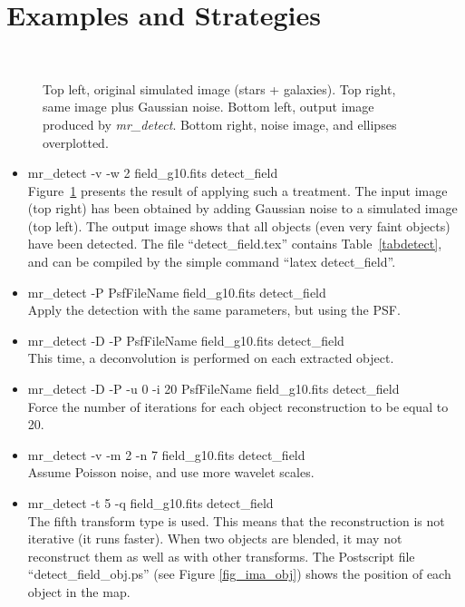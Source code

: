 \section{Examples and Strategies}

\begin{figure}[htb]
\centerline{
\vbox{
\hbox{
}
\hbox{
}
}}
\caption{Top left, original simulated image (stars + galaxies). Top right,
same image plus Gaussian noise. Bottom left, output image produced by
{\em mr\_detect}. Bottom right, noise image, and ellipses overplotted.}
\label{fig_bert}
\end{figure}

\begin{itemize}
\item  mr\_detect -v -w 2 field\_g10.fits detect\_field \\
Figure~\ref{fig_bert} presents the result of applying such a treatment.
The input image (top right)  has been obtained by adding 
Gaussian noise to a simulated image (top left). The output image shows
that all objects (even very faint objects) have been detected.
The file ``detect\_field.tex'' contains Table~\ref{tabdetect}, and
can be compiled by the simple command ``latex detect\_field''.
\item mr\_detect -P PsfFileName field\_g10.fits detect\_field \\
Apply the detection with the same parameters, but using the PSF.
\item mr\_detect -D -P PsfFileName field\_g10.fits detect\_field \\
This time, a deconvolution is performed on each extracted object. 
\item mr\_detect -D -P -u 0 -i 20 PsfFileName field\_g10.fits detect\_field \\
Force the number of iterations for each object reconstruction to be equal to 20.
\item  mr\_detect -v -m 2 -n 7 field\_g10.fits detect\_field \\
Assume Poisson noise, and use more wavelet scales.
\item  mr\_detect -t 5 -q field\_g10.fits detect\_field \\
The fifth transform type is used. 
This means that the reconstruction is not iterative
(it runs faster). When two objects are blended, 
it may not reconstruct them as
well as with other transforms.
The Postscript file ``detect\_field\_obj.ps'' (see Figure \ref{fig_ima_obj}) 
shows the position of each object in the map.

\end{itemize}

